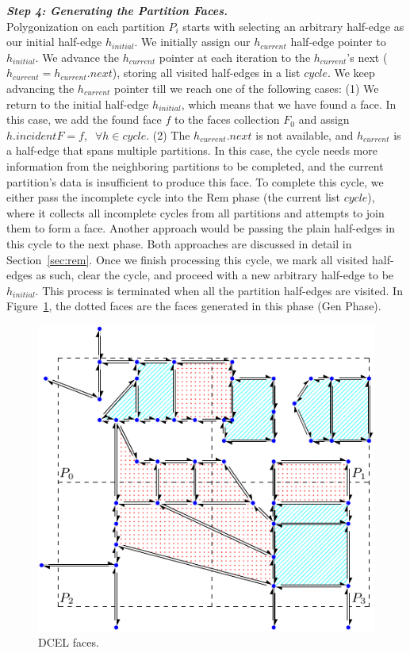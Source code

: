 \vspace{4pt}
\textit{\textbf{Step 4: Generating the Partition Faces.}}
\\
Polygonization on each partition $P_i$ starts with selecting an arbitrary half-edge as our initial half-edge $h_{initial}$.
We initially assign our $h_{current}$ half-edge pointer to $h_{initial}$. We advance the $h_{current}$ pointer at each iteration to the $h_{current}$'s next 
($h_{current} = h_{current}.next$), storing all visited half-edges in a list $cycle$. We keep advancing the $h_{current}$ pointer till we reach one of the 
following cases:
(1) We return to the initial half-edge $h_{initial}$, which means that we have found a face. In this case, we add the found face $f$ to the faces collection 
$F_0$ and assign $h.incidentF = f, \;\; \forall h \in cycle$.
(2) The $h_{current}.next$ is not available, and $h_{current}$ is a half-edge that spans multiple partitions. In this case, the cycle needs more information 
from the neighboring partitions to be completed, and the current partition's data is insufficient to produce this face.
To complete this cycle, we either pass the incomplete cycle into the Rem phase (the current list $cycle$), where it collects all incomplete cycles from all 
partitions and attempts to join them to form a face. Another approach would be passing the plain half-edges in this cycle to the next phase. Both approaches are 
discussed in detail in Section~\ref{sec:rem}.
Once we finish processing this cycle, we mark all visited half-edges as such, clear the cycle, and proceed with a new arbitrary half-edge to be $h_{initial}$.
This process is terminated when all the partition half-edges are visited.
In Figure~\ref{fig:ddcel:faces}, the dotted faces are the faces generated in this phase (Gen Phase).

\begin{figure}[tb]
	\centering
	\includegraphics[width=0.75 \linewidth ]{chapterSDCEL/model/ddcel-3}
	\caption{DCEL faces.}
	\label{fig:ddcel:faces}
\end{figure}
